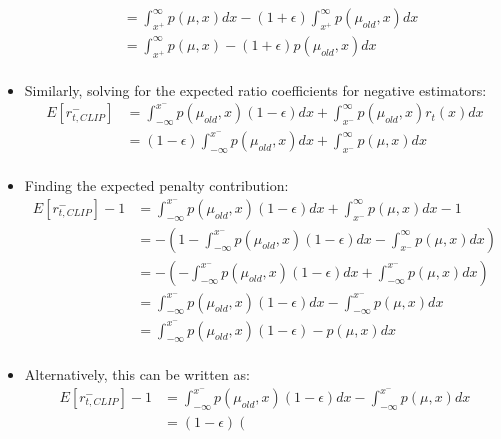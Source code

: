\documentclass[a4paper]{article}
\begin{document}
\begin{itemize}
\begin{align*}
            &= \int_{x^{+}}^{\infty}
            p(\mu, x)
            dx -
            (1 + \epsilon)
            \int_{x^{+}}^{\infty}p(\mu_{old}, x)dx\\
            &= 
            \int_{x^{+}}^{\infty}
            p(\mu, x) -
            (1 + \epsilon)
            p(\mu_{old}, x)dx\\
    \end{align*}
    \item Similarly, solving for the expected ratio coefficients for negative estimators:
    \begin{align*}
        E[r_{t, CLIP}^{-}] &= \int_{-\infty}^{x^{-}}p(\mu_{old}, x)(1 -
                            \epsilon)dx
                            +
                            \int_{x^{-}}^{\infty}p(\mu_{old}, x)r_{t}(x)dx\\
        &= (1 - \epsilon)\int_{-\infty}^{x^{-}}p(\mu_{old}, x)dx
        +
        \int_{x^{-}}^{\infty}p(\mu, x)dx\\
    \end{align*}
    \item Finding the expected penalty contribution:
    \begin{align*}
        E[r_{t, CLIP}^{-}] - 1 &= \int_{-\infty}^{x^{-}}p(\mu_{old}, x)(1 -
                            \epsilon)dx
                            +
                            \int_{x^{-}}^{\infty}p(\mu, x)dx - 1\\
        &= -\left(1 - \int_{-\infty}^{x^{-}}p(\mu_{old}, x)(1 - \epsilon)dx
        -
        \int_{x^{-}}^{\infty}p(\mu, x)dx \right)\\
        &= -\left(
        - \int_{-\infty}^{x^{-}}p(\mu_{old}, x)(1 - \epsilon)dx
        +
        \int_{-\infty}^{x^{-}}p(\mu, x)dx 
        \right)\\
        &= 
        \int_{-\infty}^{x^{-}}p(\mu_{old}, x)(1 - \epsilon)dx
        -
        \int_{-\infty}^{x^{-}}p(\mu, x)dx 
        \\
        &= 
        \int_{-\infty}^{x^{-}}p(\mu_{old}, x)(1 - \epsilon) - p(\mu, x)dx
        \\
    \end{align*}
    \item Alternatively, this can be written as:
    \begin{align*}
        E[r_{t, CLIP}^{-}] - 1 &= 
        \int_{-\infty}^{x^{-}}p(\mu_{old}, x)(1 - \epsilon)dx
        -
        \int_{-\infty}^{x^{-}}p(\mu, x)dx 
        \\
        &= 
        (1 - \epsilon)\left(

\end{align*}
\end{itemize}
\end{document}
